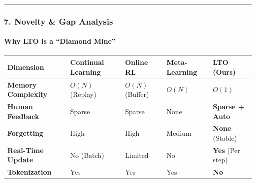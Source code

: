 \documentclass[
  11pt,
  a4paper,
]{article}
\begin{document}
\begin{center}\rule{0.5\linewidth}{0.5pt}\end{center}

\subsubsection{7. Novelty \& Gap Analysis}\label{novelty-gap-analysis}

\paragraph{Why LTO is a ``Diamond
Mine''}\label{why-lto-is-a-diamond-mine}

\begin{longtable}[]{@{}
  >{\raggedright\arraybackslash}p{}
  >{\raggedright\arraybackslash}p{}
  >{\raggedright\arraybackslash}p{}
  >{\raggedright\arraybackslash}p{}
  >{\raggedright\arraybackslash}p{}@{}}
\toprule\noalign{}
\begin{minipage}[b]{\linewidth}\raggedright
Dimension
\end{minipage} & \begin{minipage}[b]{\linewidth}\raggedright
Continual Learning
\end{minipage} & \begin{minipage}[b]{\linewidth}\raggedright
Online RL
\end{minipage} & \begin{minipage}[b]{\linewidth}\raggedright
Meta-Learning
\end{minipage} & \begin{minipage}[b]{\linewidth}\raggedright
\textbf{LTO (Ours)}
\end{minipage} \\
\midrule\noalign{}
\endhead
\bottomrule\noalign{}
\endlastfoot
\textbf{Memory Complexity} & \(O(N)\) (Replay) & \(O(N)\) (Buffer) &
\(O(N)\) & \textbf{\(O(1)\)} \\
\textbf{Human Feedback} & Sparse & Sparse & None & \textbf{Sparse +
Auto} \\
\textbf{Forgetting} & High & High & Medium & \textbf{None} (Stable) \\
\textbf{Real-Time Update} & No (Batch) & Limited & No & \textbf{Yes}
(Per step) \\
\textbf{Tokenization} & Yes & Yes & Yes & \textbf{No} \\
\end{longtable}
\end{document}
